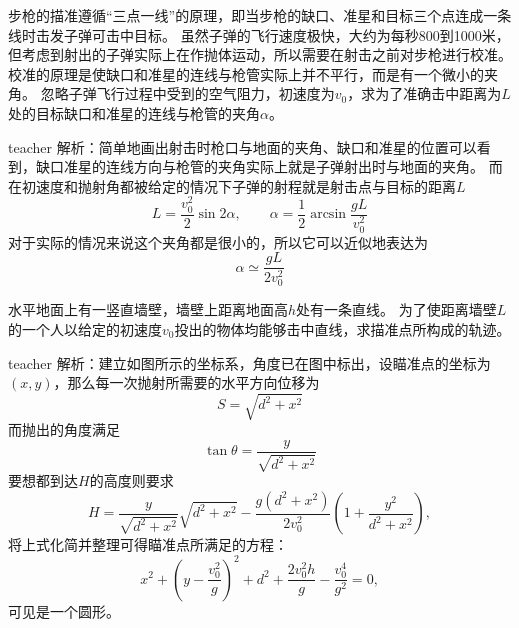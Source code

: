 \begin{example}
步枪的描准遵循“三点一线”的原理，即当步枪的缺口、准星和目标三个点连成一条线时击发子弹可击中目标。
虽然子弹的飞行速度极快，大约为每秒800到1000米，但考虑到射出的子弹实际上在作抛体运动，所以需要在射击之前对步枪进行校准。
校准的原理是使缺口和准星的连线与枪管实际上并不平行，而是有一个微小的夹角。
忽略子弹飞行过程中受到的空气阻力，初速度为$v_0$，求为了准确击中距离为$L$处的目标缺口和准星的连线与枪管的夹角$\alpha$。
\begin{taggedblock}{teacher}
\newline
解析：简单地画出射击时枪口与地面的夹角、缺口和准星的位置可以看到，缺口准星的连线方向与枪管的夹角实际上就是子弹射出时与地面的夹角。
而在初速度和抛射角都被给定的情况下子弹的射程就是射击点与目标的距离$L$
\[L=\frac{v_0^2}{2}\sin 2 \alpha, \qquad \alpha = \frac{1}{2}\arcsin\frac{gL}{v_0^2}\]
对于实际的情况来说这个夹角都是很小的，所以它可以近似地表达为
\[\alpha \simeq \frac{gL}{2v_0^2}\]
\end{taggedblock}
\end{example}

\begin{example}
水平地面上有一竖直墙壁，墙壁上距离地面高$h$处有一条直线。
为了使距离墙壁$L$的一个人以给定的初速度$v_0$投出的物体均能够击中直线，求描准点所构成的轨迹。
\begin{taggedblock}{teacher}
\vspace*{4cm}
\newline
解析：建立如图所示的坐标系，角度已在图中标出，设瞄准点的坐标为$(x,y)$，那么每一次抛射所需要的水平方向位移为
\[
S = \sqrt{d^2+x^2}
\]
而抛出的角度满足
\[
\tan\theta = \frac{y}{\sqrt{d^2+x^2}}
\]
要想都到达$H$的高度则要求
\[
H = \frac{y}{\sqrt{d^2+x^2}}\sqrt{d^2+x^2}-\frac{g(d^2+x^2)}{2v_0^2}(1+\frac{y^2}{d^2+x^2}),
\]
将上式化简并整理可得瞄准点所满足的方程：
\[
x^2+(y-\frac{v_0^2}{g})^2+d^2+\frac{2v_0^2h}{g}-\frac{v_0^4}{g^2}=0,
\]
可见是一个圆形。
\end{taggedblock}
\end{example}












